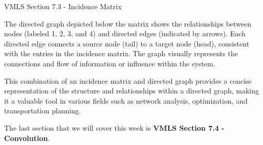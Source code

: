 \begin{notes}{VMLS Section 7.3 - Incidence Matrix}
\begin{highlight}
\begin{center}
        \end{center}
        The directed graph depicted below the matrix shows the relationships between nodes (labeled 1, 2, 3, and 4) and directed edges (indicated by arrows). Each directed edge connects a source node 
        (tail) to a target node (head), consistent with the entries in the incidence matrix. The graph visually represents the connections and flow of information or influence within the system.

        This combination of an incidence matrix and directed graph provides a concise representation of the structure and relationships within a directed graph, making it a valuable tool in various 
        fields such as network analysis, optimization, and transportation planning.
    \end{highlight}
\end{notes}

The last section that we will cover this week is \textbf{VMLS Section 7.4 - Convolution}.

